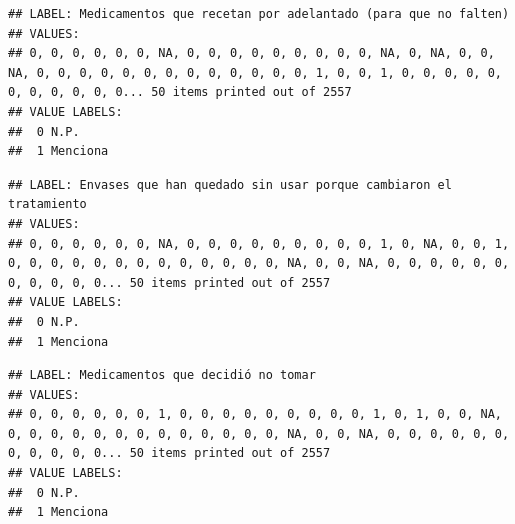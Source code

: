 \documentclass[
]{book}
\newenvironment{Shaded}{\begin{snugshade}}{\end{snugshade}}
\newcommand{\NormalTok}[1]{#1}
\newcommand{\SpecialCharTok}[1]{\textcolor[rgb]{0.00,0.00,0.00}{#1}}
\begin{document}
\begin{Shaded}
\end{Shaded}

\begin{verbatim}
## LABEL: Medicamentos que recetan por adelantado (para que no falten) 
## VALUES:
## 0, 0, 0, 0, 0, 0, NA, 0, 0, 0, 0, 0, 0, 0, 0, 0, NA, 0, NA, 0, 0, NA, 0, 0, 0, 0, 0, 0, 0, 0, 0, 0, 0, 0, 0, 1, 0, 0, 1, 0, 0, 0, 0, 0, 0, 0, 0, 0, 0, 0... 50 items printed out of 2557 
## VALUE LABELS:           
##  0 N.P.    
##  1 Menciona
\end{verbatim}

\begin{Shaded}
\end{Shaded}

\begin{verbatim}
## LABEL: Envases que han quedado sin usar porque cambiaron el tratamiento 
## VALUES:
## 0, 0, 0, 0, 0, 0, NA, 0, 0, 0, 0, 0, 0, 0, 0, 0, 1, 0, NA, 0, 0, 1, 0, 0, 0, 0, 0, 0, 0, 0, 0, 0, 0, 0, 0, NA, 0, 0, NA, 0, 0, 0, 0, 0, 0, 0, 0, 0, 0, 0... 50 items printed out of 2557 
## VALUE LABELS:           
##  0 N.P.    
##  1 Menciona
\end{verbatim}

\begin{Shaded}
\end{Shaded}

\begin{verbatim}
## LABEL: Medicamentos que decidió no tomar 
## VALUES:
## 0, 0, 0, 0, 0, 0, 1, 0, 0, 0, 0, 0, 0, 0, 0, 0, 1, 0, 1, 0, 0, NA, 0, 0, 0, 0, 0, 0, 0, 0, 0, 0, 0, 0, 0, NA, 0, 0, NA, 0, 0, 0, 0, 0, 0, 0, 0, 0, 0, 0... 50 items printed out of 2557 
## VALUE LABELS:           
##  0 N.P.    
##  1 Menciona
\end{verbatim}

\begin{Shaded}
\end{Shaded}
\end{document}

